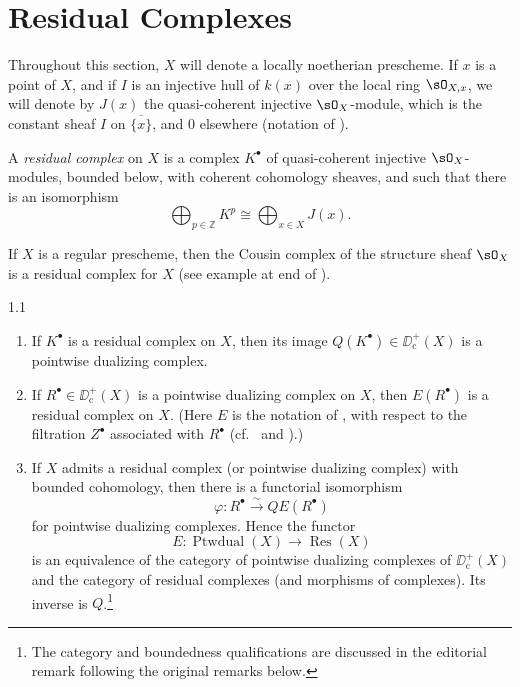 \section{Residual Complexes}\label{sec:6.1}

Throughout this section, $X$ will denote a locally noetherian prescheme. If $x$ is a point of $X$, and if $I$ is an injective hull of $k(x)$ over the local ring $\sO_{X,x}$, we will denote by $J(x)$ the quasi-coherent injective $\sO_X$-module, which is the constant sheaf $I$ on $\overline{\{x\}}$, and $0$ elsewhere (notation of ).

\begin{definition*}
A \emph{residual complex} on $X$ is a complex $K^\bullet$ of quasi-coherent injective $\sO_X$-modules, bounded below, with coherent cohomology sheaves, and such that there is an isomorphism
\[
\bigoplus_{p\in\mathbb{Z}} K^{p} \cong \bigoplus_{x\in X} J(x).
\]
\end{definition*}

\begin{example*}
If $X$ is a regular prescheme, then the Cousin complex of the structure sheaf $\sO_X$ is a residual complex for $X$ (see example at end of ).
\end{example*}

\begin{bookproposition}{1.1}\label{prop:6.1.1}
\begin{enumerate}
\item[a)] If $K^\bullet$ is a residual complex on $X$, then its image $Q(K^\bullet)\in\DD^+_{\mathrm{c}}(X)$ is a pointwise dualizing complex.
\item[b)] If $R^\bullet\in\DD^+_{\mathrm{c}}(X)$ is a pointwise dualizing complex on $X$, then $E(R^\bullet)$ is a residual complex on $X$. (Here $E$ is the notation of , with respect to the filtration $Z^\bullet$ associated with $R^\bullet$ (cf.\  and ).)
\item[c)] If $X$ admits a residual complex (or pointwise dualizing complex) with bounded cohomology, then there is a functorial isomorphism
\[
\varphi\colon R^{\bullet}\xrightarrow{\sim} QE(R^{\bullet})
\]
for pointwise dualizing complexes. Hence the functor
\[
E\colon \operatorname{Ptwdual}(X)\longrightarrow \operatorname{Res}(X)
\]
is an equivalence of the category of pointwise dualizing complexes of $\DD_{\mathrm{c}}^{+}(X)$ and the category of residual complexes (and morphisms of complexes). Its inverse is $Q$.\footnote{The category and boundedness qualifications are discussed in the editorial remark following the original remarks below.}
\end{enumerate}
\end{bookproposition}

